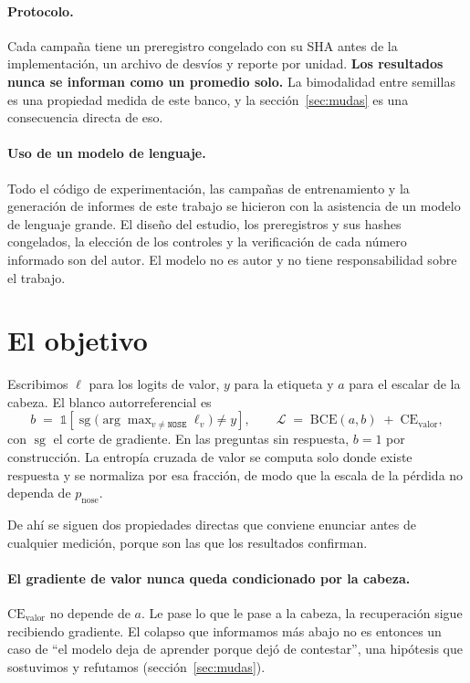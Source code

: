 \documentclass[11pt,a4paper]{article}
\begin{document}
\paragraph{Protocolo.} Cada campaña tiene un preregistro congelado con su SHA antes de la
implementación, un archivo de desvíos y reporte por unidad. \textbf{Los resultados nunca se informan
como un promedio solo.} La bimodalidad entre semillas es una propiedad medida de este banco, y la
sección~\ref{sec:mudas} es una consecuencia directa de eso.

\paragraph{Uso de un modelo de lenguaje.} Todo el código de experimentación, las campañas de
entrenamiento y la generación de informes de este trabajo se hicieron con la asistencia de un modelo
de lenguaje grande. El diseño del estudio, los preregistros y sus hashes congelados, la elección de los
controles y la verificación de cada número informado son del autor. El modelo no es autor y no tiene
responsabilidad sobre el trabajo.

\section{El objetivo}
\label{sec:objetivo}

Escribimos $\ell$ para los logits de valor, $y$ para la etiqueta y $a$ para el escalar de la cabeza. El
blanco autorreferencial es
\[
b \;=\; \mathbb{1}\!\left[\operatorname{sg}\!\big(\arg\max\nolimits_{v \neq \texttt{NOSE}} \ell_v\big) \neq y\right],
\qquad
\mathcal{L} \;=\; \mathrm{BCE}(a, b) \;+\; \mathrm{CE}_{\text{valor}},
\]
con $\operatorname{sg}$ el corte de gradiente. En las preguntas sin respuesta, $b = 1$ por
construcción. La entropía cruzada de valor se computa solo donde existe respuesta y se normaliza por
esa fracción, de modo que la escala de la pérdida no dependa de $p_{\mathrm{nose}}$.

De ahí se siguen dos propiedades directas que conviene enunciar antes de cualquier medición, porque son
las que los resultados confirman.

\paragraph{El gradiente de valor nunca queda condicionado por la cabeza.}
$\mathrm{CE}_{\text{valor}}$ no depende de $a$. Le pase lo que le pase a la cabeza, la recuperación
sigue recibiendo gradiente. El colapso que informamos más abajo no es entonces un caso de ``el modelo
deja de aprender porque dejó de contestar'', una hipótesis que sostuvimos y refutamos
(sección~\ref{sec:mudas}).
\end{document}
